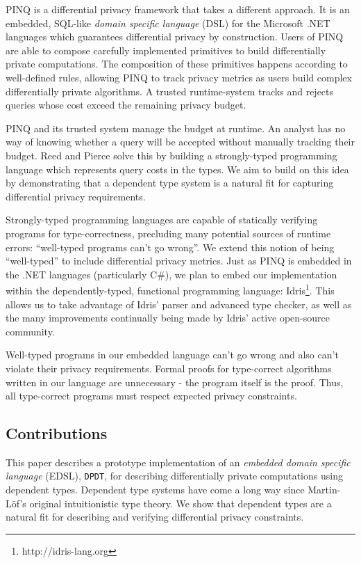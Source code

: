 \documentclass[12pt]{article}
\begin{document}
PINQ is a differential privacy framework that takes a different approach\cite{conf/sigmod/McSherry09}.
It is an embedded, SQL-like \textit{domain specific language} (DSL) for the Microsoft .NET languages which guarantees differential privacy by construction.
Users of PINQ are able to compose carefully implemented primitives to build differentially private computations.
The composition of these primitives happens according to well-defined rules, allowing PINQ to track privacy metrics as users build complex differentially private algorithms.
A trusted runtime-system tracks and rejects queries whose cost exceed the remaining privacy budget.

PINQ and its trusted system manage the budget at runtime.
An analyst has no way of knowing whether a query will be accepted without manually tracking their budget.
Reed and Pierce solve this by building a strongly-typed programming language which represents query costs in the types\cite{conf/icfp/ReedP10}.
We aim to build on this idea by demonstrating that a dependent type system is a natural fit for capturing differential privacy requirements.

Strongly-typed programming languages are capable of statically verifying programs for type-correctness, precluding many potential sources of runtime errors: ``well-typed programs can't go wrong''.
We extend this notion of being ``well-typed'' to include differential privacy metrics.
Just as PINQ is embedded in the .NET languages (particularly C\#), we plan to embed our implementation within the dependently-typed, functional programming language: Idris\footnote{http://idris-lang.org}.
This allows us to take advantage of Idris' parser and advanced type checker, as well as the many improvements continually being made by Idris' active open-source community.

Well-typed programs in our embedded language can't go wrong and also can't violate their privacy requirements.
Formal proofs for type-correct algorithms written in our language are unnecessary - the program itself is the proof.
Thus, all type-correct programs must respect expected privacy constraints.

\subsection{Contributions}

This paper describes a prototype implementation of an \textit{embedded domain specific language} (EDSL), \texttt{DPDT}, for describing differentially private computations using dependent types.
Dependent type systems have come a long way since Martin-L\"of's original intuitionistic type theory\cite{mlitt}.
We show that dependent types are a natural fit for describing and verifying differential privacy constraints.
\end{document}
